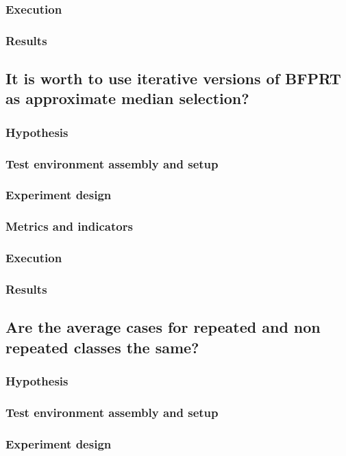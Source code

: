 \documentclass{iccmemoria}
\begin{document}
\subsubsection{Execution}
\subsubsection{Results}

\subsection{It is worth to use iterative versions of BFPRT as approximate median selection?}
\subsubsection{Hypothesis}
\subsubsection{Test environment assembly and setup}
\subsubsection{Experiment design}
\subsubsection{Metrics and indicators}
\subsubsection{Execution}
\subsubsection{Results}

\subsection{Are the average cases for repeated and non repeated classes the same?} %
\subsubsection{Hypothesis}
\subsubsection{Test environment assembly and setup}
\subsubsection{Experiment design}
\end{document}
